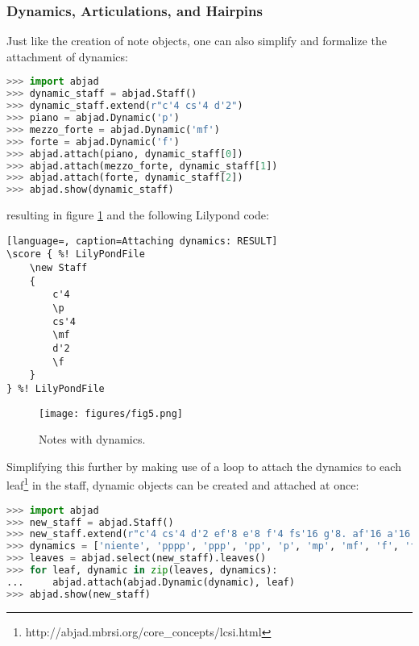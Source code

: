 \subsubsection{Dynamics, Articulations, and Hairpins}

Just like the creation of note objects, one can also simplify and formalize the attachment of dynamics:

\singlespace
\begin{lstlisting}[language=Python, caption=Attaching dynamics]
>>> import abjad
>>> dynamic_staff = abjad.Staff()
>>> dynamic_staff.extend(r"c'4 cs'4 d'2")
>>> piano = abjad.Dynamic('p')
>>> mezzo_forte = abjad.Dynamic('mf')
>>> forte = abjad.Dynamic('f')
>>> abjad.attach(piano, dynamic_staff[0])
>>> abjad.attach(mezzo_forte, dynamic_staff[1])
>>> abjad.attach(forte, dynamic_staff[2])
>>> abjad.show(dynamic_staff)
\end{lstlisting}
\doublespace

resulting in figure \ref{fig:dynamic_attachment_1} and the following Lilypond code:

\singlespace
\begin{lstlisting}[language=, caption=Attaching dynamics: RESULT]
\score { %! LilyPondFile
    \new Staff
    {
        c'4
        \p
        cs'4
        \mf
        d'2
        \f
    }
} %! LilyPondFile
\end{lstlisting}
\doublespace

\singlespace
\begin{figure}[h]
  \texttt{[image: figures/fig5.png]}
  \caption{Notes with dynamics.}
  \label{fig:dynamic_attachment_1}
\end{figure}
\doublespace

Simplifying this further by making use of a loop to attach the dynamics to each leaf\footnote{http://abjad.mbrsi.org/core\_concepts/lcsi.html} in the staff, dynamic objects can be created and attached at once:

\singlespace
\begin{lstlisting}[language=Python, caption=Attaching more dynamics]
>>> import abjad
>>> new_staff = abjad.Staff()
>>> new_staff.extend(r"c'4 cs'4 d'2 ef'8 e'8 f'4 fs'16 g'8. af'16 a'16 bf'16 b'16")
>>> dynamics = ['niente', 'pppp', 'ppp', 'pp', 'p', 'mp', 'mf', 'f', 'ff', 'fff', 'ffff', 'sfz', ]
>>> leaves = abjad.select(new_staff).leaves()
>>> for leaf, dynamic in zip(leaves, dynamics):
...     abjad.attach(abjad.Dynamic(dynamic), leaf)
>>> abjad.show(new_staff)
\end{lstlisting}
\doublespace

